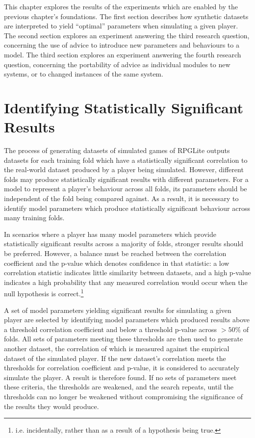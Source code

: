 This chapter explores the results of the experiments which are enabled by the
previous chapter's foundations.
The first section describes how synthetic datasets are interpreted to yield
``optimal'' parameters when simulating a given player.
The second section explores an experiment answering the third research question,
concerning the use of advice to introduce new parameters and behaviours to a model.
The third section explores an experiment answering the fourth research question,
concerning the portability of advice as individual modules to new systems, or to
changed instances of the same system.



\section{Identifying Statistically Significant Results}
\label{exp_identiying_statistically_significant_results}

The process of generating datasets of simulated games of RPGLite outputs
datasets for each training fold which have a statistically significant
correlation to the real-world dataset produced by a player being simulated.
However, different folds may produce statistically significant results with
different parameters. For a model to represent a player's behaviour across all
folds, its parameters should be independent of the fold being compared against.
As a result, it is necessary to identify model parameters which produce
statistically significant behaviour across many training folds.

In scenarios where a player has many model parameters which provide
statistically significant results across a majority of folds, stronger results
should be preferred. However, a balance must be reached between the \tau{}
correlation coefficient and the p-value which denotes confidence in that
statistic: a low correlation statistic indicates little similarity between
datasets, and a high p-value indicates a high probability that any measured
correlation would occur when the null hypothesis is correct.\footnote{i.e. incidentally,
rather than as a result of a hypothesis being true.}

A set of model parameters yielding significant results for simulating a given
player are selected by identifying model parameters which produced results above
a threshold correlation coefficient and below a threshold p-value across $>50\%$
of folds. All sets of parameters meeting these thresholds are then used to
generate another dataset, the correlation of which is measured against the
empirical dataset of the simulated player. If the new dataset's correlation
meets the thresholds for correlation coefficient and p-value, it is considered
to accurately simulate the player. A result is therefore found. If no sets of
parameters meet these criteria, the thresholds are weakened, and the search
repeats, until the thresholds can no longer be weakened without compromising the
significance of the results they would produce.

